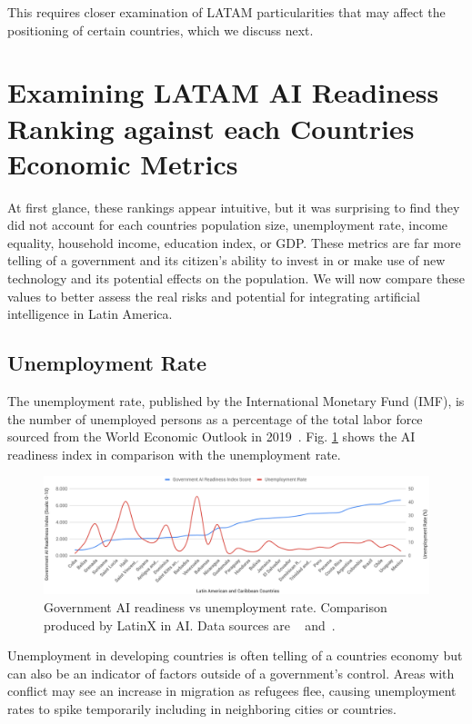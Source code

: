 \documentclass[conference]{IEEEtran}
\begin{document}
This requires closer examination of LATAM particularities that may affect the positioning of certain countries, which we discuss next.


\section{Examining LATAM AI Readiness Ranking against each Countries Economic Metrics}

At first glance, these rankings appear intuitive, but it was surprising to find they did not account for each countries population size, unemployment rate, income equality, household income, education index, or GDP. These metrics are far more telling of a government and its citizen's ability to invest in or make use of new technology and its potential effects on the population. We will now compare these values to better assess the real risks and potential for integrating artificial intelligence in Latin America.

\subsection{Unemployment Rate}
The unemployment rate, published by the International Monetary Fund (IMF), is the number of unemployed persons as a percentage of the total labor force sourced from the World Economic Outlook in 2019~\cite{nam2019world}. Fig. \ref{fig:unemployment} shows the AI readiness index in comparison with the unemployment rate. 
\begin{figure}[!t]
\centering
\includegraphics[width=\textwidth]{unemployment}
\caption{Government AI readiness vs unemployment rate. Comparison produced by LatinX in AI\texttrademark. Data sources are ~\cite{miller2019government} and~\cite{nam2019world}.}
\label{fig:unemployment}
\end{figure}
Unemployment in developing countries is often telling of a countries economy but can also be an indicator of factors outside of a government's control. Areas with conflict may see an increase in migration as refugees flee, causing unemployment rates to spike temporarily including in neighboring cities or countries.
\end{document}
